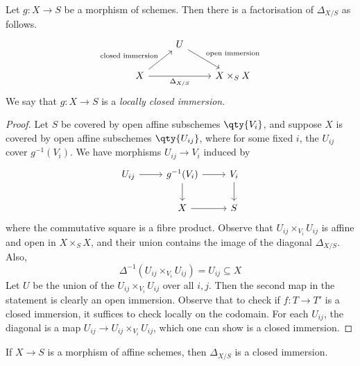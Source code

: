 \begin{proposition}
    Let \( g : X \to S \) be a morphism of schemes.
    Then there is a factorisation of \( \Delta_{X/S} \) as follows.
\[\begin{tikzcd}
	& U \\
	X && {X \times_S X}
	\arrow["{\text{closed immersion}}", from=2-1, to=1-2]
	\arrow["{\text{open immersion}}", from=1-2, to=2-3]
	\arrow["{\Delta_{X/S}}"', from=2-1, to=2-3]
\end{tikzcd}\]
    We say that \( g : X \to S \) is a \emph{locally closed immersion}.
\end{proposition}
\begin{proof}
    Let \( S \) be covered by open affine subschemes \( \qty{V_i} \), and suppose \( X \) is covered by open affine subschemes \( \qty{U_{ij}} \), where for some fixed \( i \), the \( U_{ij} \) cover \( g^{-1}(V_i) \).
    We have morphisms \( U_{ij} \to V_i \) induced by
\[\begin{tikzcd}
	{U_{ij}} & {g^{-1}(V_i)} & {V_i} \\
	& X & S
	\arrow[from=1-1, to=1-2]
	\arrow[from=1-2, to=1-3]
	\arrow[from=1-3, to=2-3]
	\arrow[from=1-2, to=2-2]
	\arrow[from=2-2, to=2-3]
\end{tikzcd}\]
    where the commutative square is a fibre product.
    Observe that \( U_{ij} \times_{V_i} U_{ij} \) is affine and open in \( X \times_S X \), and their union contains the image of the diagonal \( \Delta_{X/S} \).
    Also,
    \[ \Delta^{-1}(U_{ij} \times_{V_i} U_{ij}) = U_{ij} \subseteq X \]
    Let \( U \) be the union of the \( U_{ij} \times_{V_i} U_{ij} \) over all \( i, j \).
    Then the second map in the statement is clearly an open immersion.
    Observe that to check if \( f : T \to T' \) is a closed immersion, it suffices to check locally on the codomain.
    For each \( U_{ij} \), the diagonal is a map \( U_{ij} \to U_{ij} \times_{V_i} U_{ij} \), which one can show is a closed immersion.
\end{proof}
\begin{proposition}
    If \( X \to S \) is a morphism of affine schemes, then \( \Delta_{X/S} \) is a closed immersion.
\end{proposition}
